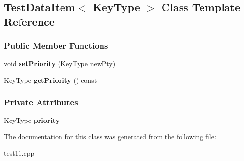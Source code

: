 \hypertarget{class_test_data_item}{}\subsection{Test\+Data\+Item$<$ Key\+Type $>$ Class Template Reference}
\label{class_test_data_item}
\subsubsection*{Public Member Functions}
\begin{DoxyCompactItemize}
\item 
void {\bfseries set\+Priority} (Key\+Type new\+Pty)\hypertarget{class_test_data_item_a84667429c081b1dbb212956c88011216}{}\label{class_test_data_item_a84667429c081b1dbb212956c88011216}

\item 
Key\+Type {\bfseries get\+Priority} () const \hypertarget{class_test_data_item_ac1632213d959555ec8f5aee8a1505d72}{}\label{class_test_data_item_ac1632213d959555ec8f5aee8a1505d72}

\end{DoxyCompactItemize}
\subsubsection*{Private Attributes}
\begin{DoxyCompactItemize}
\item 
Key\+Type {\bfseries priority}\hypertarget{class_test_data_item_a9b1a2617cb7a831206d189559e8e2e8b}{}\label{class_test_data_item_a9b1a2617cb7a831206d189559e8e2e8b}

\end{DoxyCompactItemize}


The documentation for this class was generated from the following file\+:\begin{DoxyCompactItemize}
\item 
test11.\+cpp\end{DoxyCompactItemize}
